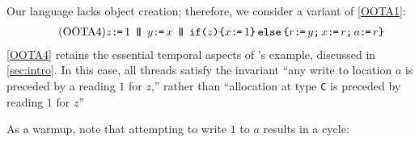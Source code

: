 \begin{example}
  \label{ex:lochb}
  Our language lacks object creation; therefore, we consider a variant of
  \ref{OOTA1}:
\begin{align*}
  \tag{OOTA4}\label{OOTA4}
  z\GETS1
  \PAR
    y\GETS x
  \PAR
    \IF{z}\THEN x\GETS1 \ELSE r\GETS y \SEMI x\GETS r \SEMI a\GETS r \FI
\end{align*}
\ref{OOTA4} retains the essential temporal aspects of
\citeauthor{DBLP:journals/toplas/Lochbihler13}'s example, discussed in
\textsection\ref{sec:intro}.  In this case, all threads satisfy the invariant
``any write to location $a$ is preceded by a reading $1$ for $z$,'' rather
than ``allocation at type \texttt{C} is preceded by reading $1$ for $z$''

As a warmup, note that attempting to write $1$ to $a$ results in a cycle:
\begin{tikzdisplay}[node distance=1em]
\end{tikzdisplay}


\end{example}
